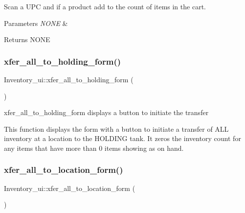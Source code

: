 Scan a U\+PC and if a product add to the count of items in the cart.


\begin{DoxyParams}{Parameters}
{\em N\+O\+NE} & \\
\hline
\end{DoxyParams}
\begin{DoxyReturn}{Returns}
N\+O\+NE 
\end{DoxyReturn}
\hypertarget{class_inventory__ui_aa78746090dbe3bcdaf4478de2efa721b}{}\label{class_inventory__ui_aa78746090dbe3bcdaf4478de2efa721b} 
\subsubsection{\texorpdfstring{xfer\+\_\+all\+\_\+to\+\_\+holding\+\_\+form()}{xfer\_all\_to\_holding\_form()}}
{\footnotesize\ttfamily Inventory\+\_\+ui\+::xfer\+\_\+all\+\_\+to\+\_\+holding\+\_\+form (\begin{DoxyParamCaption}{ }\end{DoxyParamCaption})}

xfer\+\_\+all\+\_\+to\+\_\+holding\+\_\+form displays a button to initiate the transfer

This function displays the form with a button to initiate a transfer of A\+LL inventory at a location to the H\+O\+L\+D\+I\+NG tank. It zero\textquotesingle{}s the inventory count for any items that have more than 0 items showing as on hand. \hypertarget{class_inventory__ui_a90577c96830f5f59f301034f4e130b2f}{}\label{class_inventory__ui_a90577c96830f5f59f301034f4e130b2f} 
\subsubsection{\texorpdfstring{xfer\+\_\+all\+\_\+to\+\_\+location\+\_\+form()}{xfer\_all\_to\_location\_form()}}
{\footnotesize\ttfamily Inventory\+\_\+ui\+::xfer\+\_\+all\+\_\+to\+\_\+location\+\_\+form (\begin{DoxyParamCaption}{ }\end{DoxyParamCaption})}

